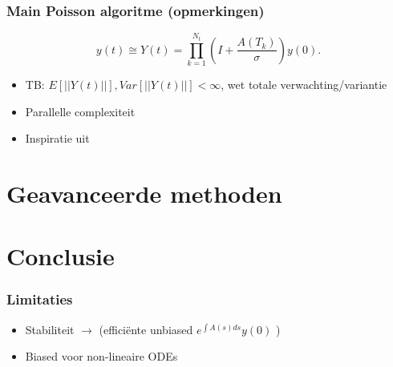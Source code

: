 \documentclass[18pt,aspectratio=149]{beamer}
\begin{document}

\begin{frame}
    \frametitle{Main Poisson algoritme (opmerkingen)}
    \begin{equation}
        y(t) \cong Y(t) =  \prod_{k=1}^{N_{t}}\left(I + \frac{A(T_{k})}{\sigma} \right)    y(0).
    \end{equation}
    \begin{itemize}
        \item TB: $E[||Y(t)||],Var[||Y(t)||]< \infty$, wet totale verwachting/variantie
        \item Parallelle complexiteit
        \item Inspiratie uit \cite{acebron_monte_2016}
    \end{itemize}
\end{frame}

\section{Geavanceerde methoden}

\begin{frame}
    \tableofcontentscurrent
\end{frame}

\section{Conclusie}

\begin{frame}
    \tableofcontentscurrent
\end{frame}

\begin{frame}
    \frametitle{Limitaties}
    \begin{itemize}
        \item Stabiliteit $\rightarrow$ \cite{kettunen_unbiased_2021}
              (efficiënte unbiased $e^{\int A(s) ds } y(0)$ )
        \item Biased voor non-lineaire ODEs
    \end{itemize}
\end{frame}
\end{document}
